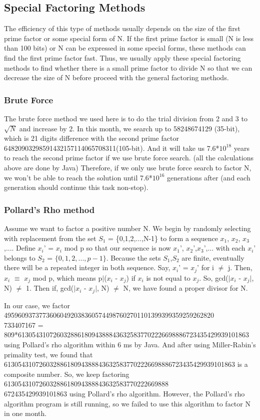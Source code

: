 \documentclass[12pt]{article} %
\begin{document}
\subsection{Special Factoring Methods}
		The efficiency of this type of methods usually depends on the size of the first prime factor or some special form of N. If the first prime factor is small (N is less than 100 bits) or N can be expressed in some special forms, these methods can find the first prime factor fast.
		Thus, we usually apply these special factoring methods to find whether there is a small prime factor to divide N so that we can decrease the size of N before proceed with the general factoring methods.
		
 \subsubsection{ Brute Force}
		The brute force method we used here is to do the trial division from 2 and 3 to $\sqrt{N}$ and increase by 2.
		In this month, we search up to 58248674129 (35-bit), which is 21 digits difference with the second prime factor 64820903298591432157114065708311(105-bit).
		And it will take us 7.6*$10^{18}$ years to reach the second prime factor if we use brute force search. (all the calculations above are done by Java) 
		Therefore, if we only use brute force search to factor N, we won't be able to reach the solution until 7.6*$10^{16}$ generations after (and each generation should continue this task non-stop).
		
 \subsubsection{Pollard's Rho method}
		Assume we want to factor a positive number N. We begin by randomly selecting with replacement from the set $S_1$ = \{0,1,2,...,N-1\} to form a sequence $x_1$, $x_2$, $x_3$,.... 
		Define $x_i$' = $x_i$ mod p so that our sequence is now $x_1$', $x_2$',$x_3$',... with each $x_i$' belongs to $S_2$ = $\{0,1,2,...,p-1\}$.
		Because the sets $S_1$,$S_2$ are finite, eventually there will be a repeated integer in both sequence. Say, $x_i$' = $x_j$' for i $\ne$ j. Then, $x_i$ $\equiv$ $x_j$ mod p, which means p$|$($x_i$ - $x_j$) if $x_i$ is not equal to $x_j$.
		So, gcd($|$$x_i$ - $x_j$$|$, N) $\ne$ 1. Then if, gcd($|$$x_i$ - $x_j$$|$, N) $\ne$ N, we have found a proper divisor for N.
		
		In our case, we factor 495960937377360604920383605744987602701101399399359259262820\\733407167 = 809*613054310726032886180943888436325837702226698886723435429939101863 using Pollard's rho algorithm within 6 ms by Java.
		And after using Miller-Rabin's primality test, we found that 613054310726032886180943888436325837702226698886723435429939101863 is a composite number.
		So, we keep factoring 61305431072603288618094388843632583770222669888\\672435429939101863 using Pollard's rho algorithm.
		However, the Pollard's rho algorithm program is still running, so we failed to use this algorithm to factor N in one month.
\end{document}
